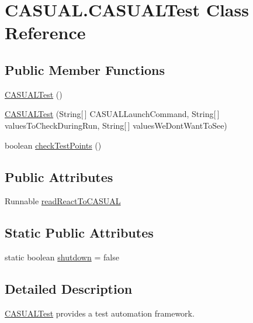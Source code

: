 \hypertarget{class_c_a_s_u_a_l_1_1_c_a_s_u_a_l_test}{\section{C\-A\-S\-U\-A\-L.\-C\-A\-S\-U\-A\-L\-Test Class Reference}
\label{class_c_a_s_u_a_l_1_1_c_a_s_u_a_l_test}
}
\subsection*{Public Member Functions}
\begin{DoxyCompactItemize}
\item 
\hyperlink{class_c_a_s_u_a_l_1_1_c_a_s_u_a_l_test_a0f63b557bad0346492822a20cd8adeed}{C\-A\-S\-U\-A\-L\-Test} ()
\item 
\hyperlink{class_c_a_s_u_a_l_1_1_c_a_s_u_a_l_test_a94f22a37a73613e0fa6e36cd706b7d6a}{C\-A\-S\-U\-A\-L\-Test} (String\mbox{[}$\,$\mbox{]} C\-A\-S\-U\-A\-L\-Launch\-Command, String\mbox{[}$\,$\mbox{]} values\-To\-Check\-During\-Run, String\mbox{[}$\,$\mbox{]} values\-We\-Dont\-Want\-To\-See)
\item 
boolean \hyperlink{class_c_a_s_u_a_l_1_1_c_a_s_u_a_l_test_aa55a58b3eb667cfad90f002549062d51}{check\-Test\-Points} ()
\end{DoxyCompactItemize}
\subsection*{Public Attributes}
\begin{DoxyCompactItemize}
\item 
Runnable \hyperlink{class_c_a_s_u_a_l_1_1_c_a_s_u_a_l_test_a96c1d034054c2e980ed6e32da5ac04f5}{read\-React\-To\-C\-A\-S\-U\-A\-L}
\end{DoxyCompactItemize}
\subsection*{Static Public Attributes}
\begin{DoxyCompactItemize}
\item 
static boolean \hyperlink{class_c_a_s_u_a_l_1_1_c_a_s_u_a_l_test_a3d022b59ea55fa0e2282e38fbd3eb102}{shutdown} = false
\end{DoxyCompactItemize}


\subsection{Detailed Description}
\hyperlink{class_c_a_s_u_a_l_1_1_c_a_s_u_a_l_test}{C\-A\-S\-U\-A\-L\-Test} provides a test automation framework.

